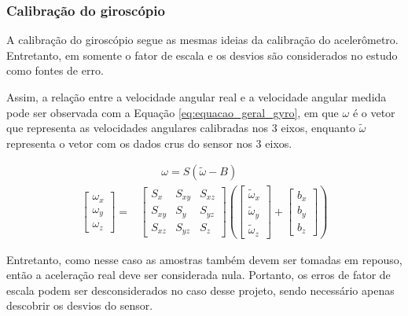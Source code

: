 \documentclass[acronym, symbols, table]{fei}
\begin{document}
		\subsubsection{Calibração do giroscópio}\label{sec:calibracao_giroscopio}
		
		A calibração do giroscópio segue as mesmas ideias da calibração do acelerômetro. Entretanto, em \textcite{hassan2020field} somente o fator de escala e os desvios são considerados no estudo como fontes de erro.
		
		Assim, a relação entre a velocidade angular real e a velocidade angular medida pode ser observada com a Equação \ref{eq:equacao_geral_gyro}, em que $\omega$ é o vetor que representa as velocidades angulares calibradas nos 3 eixos, enquanto $\tilde{\omega}$ representa o vetor com os dados crus do sensor nos 3 eixos.
		
		\begin{equation}\label{eq:equacao_geral_gyro}
			\begin{split}
				&\quad \quad \omega = S(\tilde{\omega} - B) \\
				\begin{bmatrix}
					\omega_x \\ \omega_y \\ \omega_z
				\end{bmatrix} = 
				&\begin{bmatrix}
					S_x & S_{xy} & S_{xz} \\ S_{xy} & S_y & S_{yz} \\ S_{xz} & S_{yz} & S_z
				\end{bmatrix} \left(
				\begin{bmatrix}
					\tilde{\omega}_x \\ \tilde{\omega}_y \\ \tilde{\omega}_z
				\end{bmatrix} + 
				\begin{bmatrix}
					b_x \\ b_y \\ b_z
				\end{bmatrix}\right)
			\end{split}
		\end{equation}
		
		Entretanto, como nesse caso as amostras também devem ser tomadas em repouso, então a aceleração real deve ser considerada nula. Portanto, os erros de fator de escala podem ser desconsiderados no caso desse projeto, sendo necessário apenas descobrir os desvios do sensor.
				
\end{document}
